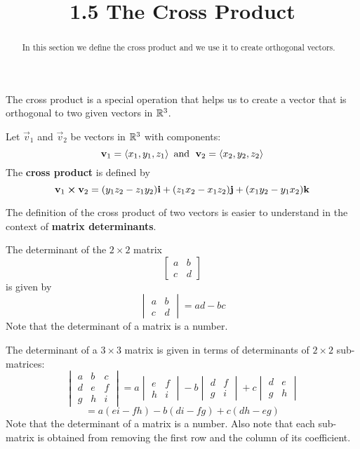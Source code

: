 \documentclass[handout]{ximera}
\title{1.5 The Cross Product}
\begin{document}
\begin{abstract}
In this section we define the cross product and we use it to create orthogonal vectors.
\end{abstract}
 
\maketitle
The cross product is a special operation that helps us to create a vector that is orthogonal to two given vectors in $\mathbb R^3$.
\begin{definition}
Let $\vec{v}_1$ and $\vec{v}_2$ be vectors in $\mathbb R^3$ with components:
\[
\mathbf{v}_1 = \left\langle x_1, y_1, z_1\right\rangle \text{  and   } \;\mathbf{v}_2 = \left\langle x_2, y_2, z_2\right\rangle
\]
The \textbf{cross product} is defined by
\[
\mathbf{v}_1 \boldsymbol\times \mathbf{v}_2 =  (y_1z_2 - z_1y_2) \mathbf{i} + (z_1x_2 - x_1z_2) \mathbf{j} + (x_1y_2 - y_1x_2) \mathbf{k} 
\]
\end{definition}

The definition of the cross product of two vectors is easier to understand in the context of \textbf{matrix determinants}.

\begin{definition}
The determinant of the $2 \times 2$ matrix 
\[
\begin{bmatrix}
a & b\\
c & d
\end{bmatrix}
\]
is  given by
\[
\begin{vmatrix}
a & b\\
c & d
\end{vmatrix}
= ad-bc
\]
Note that the determinant of a matrix is a number.
\end{definition}

\begin{definition}
The determinant of a $3 \times 3$ matrix is given in terms of determinants of $2 \times 2$ sub-matrices:
\[
\begin{vmatrix}
a & b & c\\
d & e & f\\
g & h & i
\end{vmatrix}
= a\begin{vmatrix}
 e & f\\
 h & i
\end{vmatrix}
-b
\begin{vmatrix}

d  & f\\
g  & i
\end{vmatrix}
+c\begin{vmatrix}
d & e \\
g & h 
\end{vmatrix}
\]
\[
= a(ei-fh) - b(di-fg) + c(dh-eg)
\]
Note that the determinant of a matrix is a number. 
Also note that each sub-matrix is obtained from removing the first row and the column of its coefficient.  
\end{definition}
\end{document}

